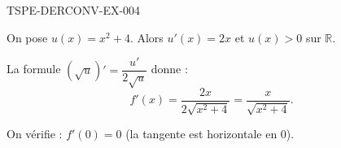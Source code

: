 \begin{corrige}{TSPE-DERCONV-EX-004}

On pose $u(x) = x^2+4$. Alors $u'(x) = 2x$ et $u(x) > 0$ sur $\mathbb{R}$.


La formule $(\sqrt{u})' = \dfrac{u'}{2\sqrt{u}}$ donne :
\[ f'(x) = \frac{2x}{2\sqrt{x^2+4}} = \frac{x}{\sqrt{x^2+4}}. \]

On vérifie : $f'(0) = 0$ (la tangente est horizontale en $0$).

\end{corrige}
